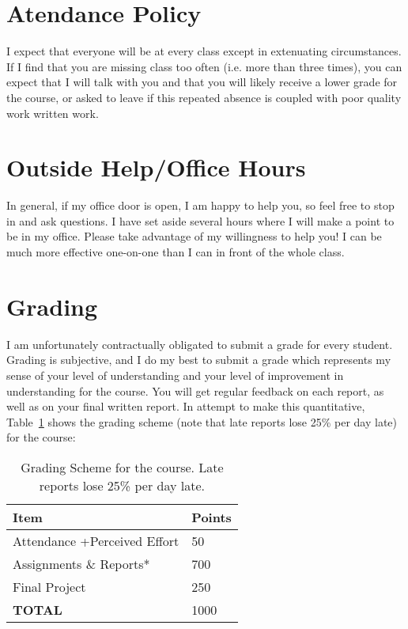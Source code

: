\documentclass[justified]{tufte-handout}
\begin{document}
\section{Atendance Policy}
I expect that everyone will be at every class except in extenuating circumstances. If I find that you are missing class too often (i.e. more than three times), you can expect that I will talk with you and that you will likely receive a lower grade for the course, or asked to leave if this repeated absence is coupled with poor quality work written work. 

\section{Outside Help/Office Hours}
In general, if my office door is open, I am happy to help you, so feel free to stop in
and ask questions. I have set aside several hours
where I will make a point to be in my office. Please take advantage of my
willingness to help you! I can be much more effective one-on-one than I can in
front of the whole class. 

\section{Grading}
I am unfortunately contractually obligated to submit a grade for every student. Grading is subjective, and I do my best to submit a grade which represents my sense of your level of understanding and your level of improvement in understanding for the course. You will get regular feedback on each report, as well as on your final written report. In attempt to make this quantitative, Table~\ref{tab:normaltab} shows the grading scheme (note that late reports lose 25\% per day late) for the course: \\
\begin{table}[h]
  \centering
  \selectfont
  \begin{tabular}{ll}
    \toprule
    Item &  Points\\
    \midrule
    Attendance +Perceived Effort & 50 \\
    Assignments \& Reports* &  700 \\
    Final Project & 250\\
    {\bf TOTAL} & 1000 \\
    \bottomrule
  \end{tabular}
  \caption{Grading Scheme for the course. Late reports lose 25\% per day late.}
  \label{tab:normaltab}
\end{table}
\end{document}

